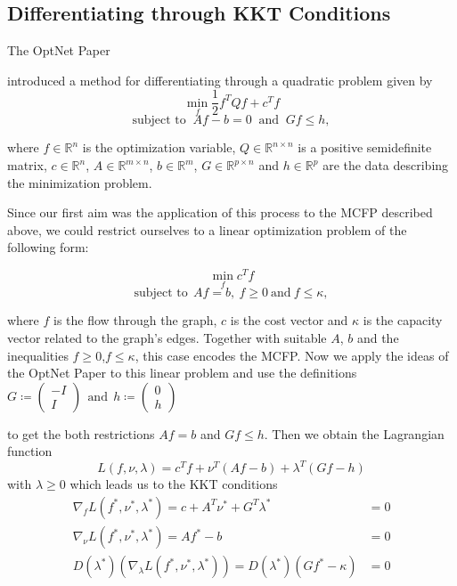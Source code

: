 \documentclass{article}
\begin{document}
\subsection{Differentiating through KKT Conditions}
\label{others}

The OptNet Paper {\cite{AmosK17}  introduced a method for differentiating through a quadratic problem given by
\[ \min_f \frac{1}{2} f^T Q f + c^T f \]
\[\text{subject to }~  Af-b=0 ~\text{ and }~ Gf \leq h, \]

where $f\in \mathbb{R}^n$ is the optimization variable, $Q\in \mathbb{R}^{n\times n}$ is a positive semidefinite matrix, $c\in \mathbb{R}^n$, $A\in \mathbb{R}^{m\times n}$, $b\in \mathbb{R}^m$, $G\in \mathbb{R}^{p\times n}$ and $h\in \mathbb{R}^p$ are the data describing the minimization problem. 

Since our first aim was the application of this process to the MCFP described above, we could restrict ourselves to a linear optimization problem of the following form:

\[\min_f c^T f\] 
\[ \text{subject to} ~~Af=b,~f\geq 0 ~\text{and}~ f \leq \kappa,\]

where $f$ is the flow through the graph, $c$ is the cost vector and $\kappa$ is the capacity vector related to the graph's edges. Together with suitable $A$, $b$ and the inequalities $f\geq 0$,\break $f\leq \kappa$, this case encodes the MCFP. Now we apply the ideas of the OptNet Paper to this linear problem and use the definitions
$G\coloneqq \begin{pmatrix} -I \\  I \end{pmatrix} ~~\text{and} ~~ h\coloneqq \begin{pmatrix} 0 \\ h \end{pmatrix} $

to get the both restrictions $Af=b$ and $Gf\leq h$. Then we obtain the Lagrangian function
\[L(f, \nu, \lambda) = c^T f + \nu ^T (Af-b) + \lambda^T(Gf-h)\]
with $\lambda \geq 0$ which leads us to the KKT conditions
\begin{align*}
\nabla_f L(f^*,\nu^*, \lambda^*) = c + A^T \nu^*  + G^T\lambda^* &= 0 \\
\nabla _\nu L(f^*, \nu^*, \lambda^*) = Af^* - b &= 0 \\
D(\lambda^*) (\nabla_\lambda L(f^*, \nu^*, \lambda^*)) = D(\lambda^*)(Gf^*-\kappa) &= 0
\end{align*}

}
\end{document}
